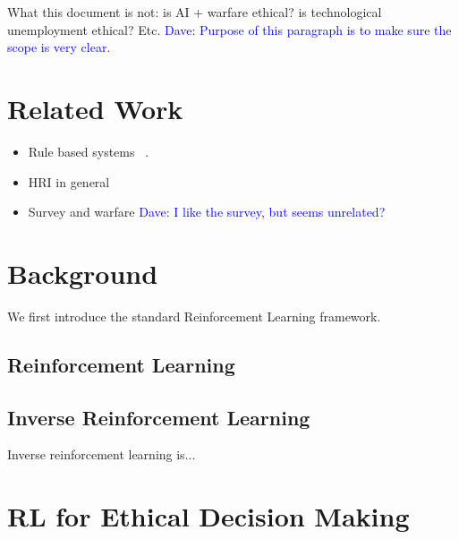 \documentclass[11pt]{article}
\newcommand\davenote[1]{\textcolor{blue}{Dave: #1}}
\begin{document}
What this document is not: is AI + warfare ethical? is technological unemployment ethical? Etc. \davenote{Purpose of this paragraph is to make sure the scope is very clear.}


\section{Related Work}

\begin{itemize}
\item Rule based systems ~\cite{briggs2015sorry}. 
\item HRI in general~\cite{scheutz2007first,tellex2011understanding}
\item Survey and warfare \davenote{I like the survey, but seems unrelated?}
\end{itemize}


\section{Background}

We first introduce the standard Reinforcement Learning framework.


\subsection{Reinforcement Learning}

\subsection{Inverse Reinforcement Learning}

Inverse reinforcement learning is...


\section{RL for Ethical Decision Making}
\end{document}
